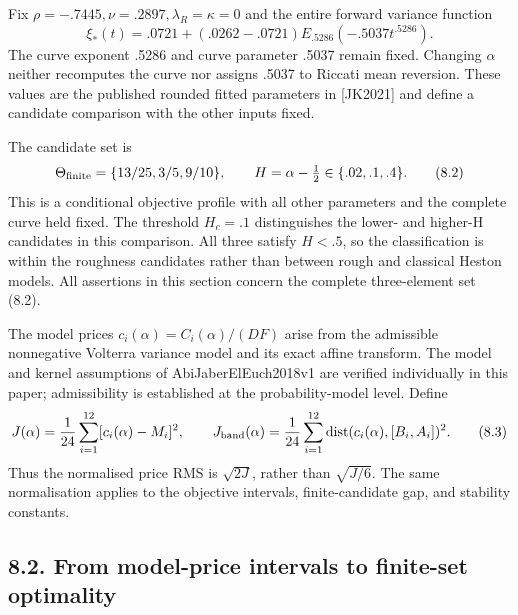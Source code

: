 \documentclass[a4paper,11pt]{article}
\begin{document}
Fix \(\rho=-.7445,\nu=.2897,\lambda_R=\kappa=0\) and the entire forward variance function
\[
\xi_*(t)=.0721+(.0262-.0721)
E_{.5286}(-.5037t^{.5286}).
\tag{8.1}
\]
The curve exponent .5286 and curve parameter .5037 remain fixed. Changing \(\alpha\) neither recomputes the curve nor assigns .5037 to Riccati mean reversion. These values are the published rounded fitted parameters in [JK2021] and define a candidate comparison with the other inputs fixed.

The candidate set is
\[
\Theta_{\rm finite}=\{13/25,3/5,9/10\},\qquad
H=\alpha-\tfrac12\in\{.02,.1,.4\}.
\tag{8.2}
\]
This is a conditional objective profile with all other parameters and the complete curve held fixed. The threshold \(H_c=.1\) distinguishes the lower- and higher-H candidates in this comparison. All three satisfy \(H<.5\), so the classification is within the roughness candidates rather than between rough and classical Heston models. All assertions in this section concern the complete three-element set (8.2).

The model prices \(c_i(\alpha)=C_i(\alpha)/(DF)\) arise from the admissible nonnegative Volterra variance model and its exact affine transform. The model and kernel assumptions of AbiJaberElEuch2018v1 are verified individually in this paper; admissibility is established at the probability-model level. Define
\[
J(\alpha)=\frac1{24}\sum_{i=1}^{12}
 [c_i(\alpha)-M_i]^2,\qquad
J_{\rm band}(\alpha)=\frac1{24}\sum_{i=1}^{12}
 \operatorname{dist}(c_i(\alpha),[B_i,A_i])^2.
\tag{8.3}
\]
Thus the normalised price RMS is \(\sqrt{2J}\), rather than \(\sqrt{J/6}\). The same normalisation applies to the objective intervals, finite-candidate gap, and stability constants.

\subsection*{8.2. From model-price intervals to finite-set optimality}
\end{document}
